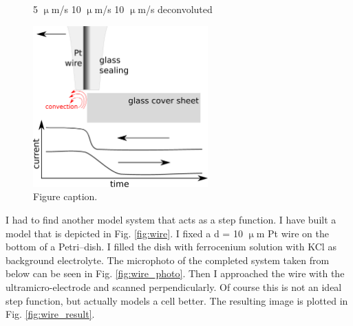 \documentclass[a4paper, 11pt, oneside, bibliography=totoc]{article}
\begin{document}
\begin{figure}
\hspace{1.3cm} 5 $\upmu$m/s \hspace{2.5cm} 10 $\upmu$m/s \hspace{1.2cm} 10 $\upmu$m/s deconvoluted \hfill

\centering
 \includegraphics[width=0.6\textwidth]{step_conv.eps}
\caption{Figure caption.}
\label{fig:convective}
\end{figure}

I had to find another model system that acts as a step function. I have built a model that is depicted in Fig. \ref{fig:wire}. I fixed a d = 10 $\upmu$m Pt wire on the bottom of a Petri--dish. I filled the dish with ferrocenium solution with KCl as background electrolyte. The microphoto of the completed system taken from below can be seen in Fig. \ref{fig:wire_photo}. Then I approached the wire with the ultramicro-electrode and scanned perpendicularly. Of course this is not an ideal step function, but actually models a cell better. The resulting image is plotted in Fig. \ref{fig:wire_result}.
\end{document}
